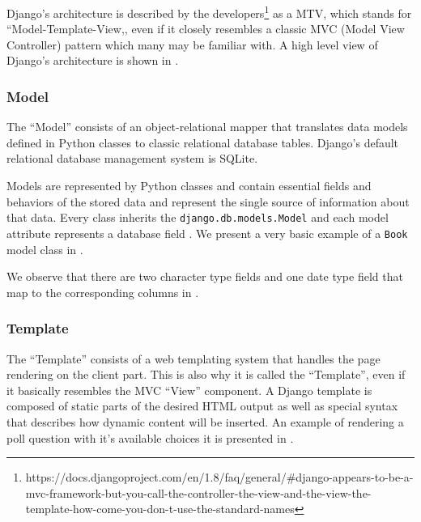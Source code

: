 Django's architecture is described by the developers\footnote{https://docs.djangoproject.com/en/1.8/faq/general/\#django-appears-to-be-a-mvc-framework-but-you-call-the-controller-the-view-and-the-view-the-template-how-come-you-don-t-use-the-standard-names\label{note1}} as a MTV, which stands for ``Model-Template-View,, even if it closely resembles a classic MVC (Model View Controller) pattern which many may be familiar with. A high level view of Django's architecture is shown in .


\subsubsection{Model}
\label{sub-sub-sec:model}

The ``Model'' consists of an object-relational mapper that translates data models defined in Python classes to classic relational database tables. Django's default relational database management system is SQLite.

Models are represented by Python classes and contain essential fields and behaviors of the stored data and represent the single source of information about that data. Every class inherits the \texttt{django.db.models.Model} and each model attribute represents a database field \cite{book5}. We present a  very basic example of a \texttt{Book} model class in .



We observe that there are two character type fields and one date type field that map to the corresponding columns in .



\subsubsection{Template}
\label{sub-sub-sec:template}

The ``Template'' consists of a web templating system that handles the page rendering on the client part. This is also why it is called the ``Template'', even if it basically resembles the MVC ``View'' component. A Django template is composed of static parts of the desired HTML output as well as special syntax that describes how dynamic content will be inserted. An example of rendering a poll question with it's available choices it is presented in .

